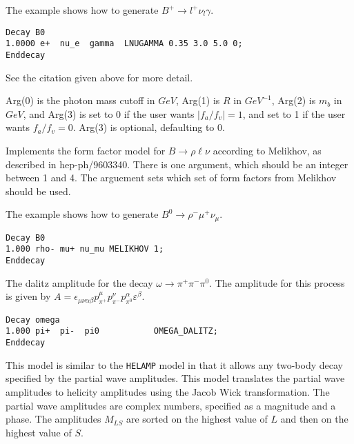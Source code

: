 \Example
The example shows how to generate ${ B^{+}} \rightarrow l^{+} \nu_{l} \gamma$.
\begin{verbatim}
Decay B0
1.0000 e+  nu_e  gamma  LNUGAMMA 0.35 3.0 5.0 0;
Enddecay
\end{verbatim}

\Notes See the citation given above for more detail.

Arg(0) is the photon mass cutoff in $GeV$, Arg(1) is $R$ in $GeV^{-1}$, Arg(2) is $m_b$ in $GeV$, and Arg(3) is set to 0 if the user wants $|f_{a}/f_{v}| = 1$, and set to 1 if the user wants $f_{a}/f_{v} = 0$. Arg(3)
is optional, defaulting to 0. 



\label{MELIKHOV}



\Expl
Implements the form factor model for $B \rightarrow \rho \ell \nu$
according to Melikhov, as described in hep-ph/9603340.  There is
one argument, which should be an integer between 1 and 4.  The
arguement sets which set of form factors from Melikhov should be used.  
 
\Example
The example shows how to generate $B^0\rightarrow \rho^- \mu^+ \nu_{\mu}$.
\begin{verbatim}
Decay B0
1.000 rho- mu+ nu_mu MELIKHOV 1;
Enddecay
\end{verbatim}



\label{omegadalitz}



\Expl
The dalitz amplitude for the decay $\omega\rightarrow \pi^+\pi^-\pi^0$.
The amplitude for this process is given by 
$A=\epsilon_{\mu\nu\alpha\beta}
p^{\mu}_{\pi^+}p^{\nu}_{\pi^-}p^{\alpha}_{\pi^0}\varepsilon^{\beta}$.

\Example
\begin{verbatim}
Decay omega
1.000 pi+  pi-  pi0           OMEGA_DALITZ;
Enddecay
\end{verbatim}




\label{partwave}



\Expl
This model is similar to the {\tt HELAMP} model in that it allows
any two-body decay specified by the partial wave amplitudes. This model
translates the partial wave amplitudes to helicity amplitudes using the 
Jacob Wick transformation. The partial wave amplitudes are complex numbers,
specified as a magnitude and a phase. The amplitudes $M_{LS}$ are
sorted on the highest value of $L$ and then on the highest value of $S$.

